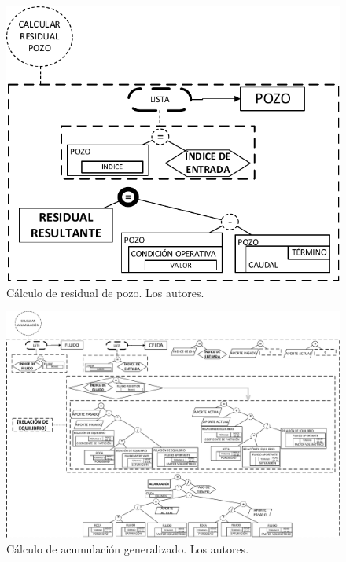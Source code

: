 \begin{figure}[h]
	\centering%
	\includegraphics[width=0.7\linewidth]{Fig/CalcularResidualPozo.pdf}%
	\caption[Cálculo de residual de pozo.]{Cálculo de residual de pozo. Los autores.} \label{fig:ResidualWell}
\end{figure}
\begin{figure}[h]
	\centering%
	\includegraphics[width=0.9\linewidth]{Fig/CalcularAcumulacion.pdf}%
	\caption[Cálculo de acumulación generalizado.]{Cálculo de acumulación generalizado. Los autores.} \label{fig:Accumulation}
\end{figure}

